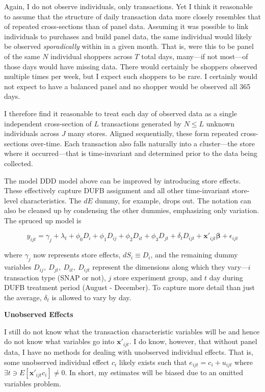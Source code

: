 \documentclass[12pt,letterpaperpaper,]{book}
\begin{document}
Again, I do not observe individuals, only transactions. Yet I think it
reasonable to assume that the structure of daily transaction data more
closely resembles that of repeated cross-sections than of panel data.
Assuming it was possible to link individuals to purchases and build
panel data, the same individual would likely be observed
\emph{sporadically} within in a given month. That is, were this to be
panel of the same \(N\) individual shoppers across \(T\) total days,
many---if not most---of those days would have missing data. There would
certainly be shoppers observed multiple times per week, but I expect
such shoppers to be rare. I certainly would not expect to have a
balanced panel and no shopper would be observed all 365 days.

I therefore find it reasonable to treat each day of observed data as a
single independent cross-section of \(L\) transactions generated by
\(N \le L\) unknown individuals across \(J\) many stores. Aligned
sequentially, these form repeated cross-sections over-time. Each
transaction also falls naturally into a cluster---the store where it
occurred---that is time-invariant and determined prior to the data being
collected.

The model DDD model above can be improved by introducing store effects.
These effectively capture DUFB assignment and all other time-invariant
store-level characteristics. The \(dE\) dummy, for example, drops out.
The notation can also be cleaned up by condensing the other dummies,
emphasizing only variation. The spruced up model is

\begin{equation}
y_{ijt} = \gamma_j + \lambda_t + \phi_0 D_i + \phi_1 D_{ij} + \phi_2 D_{it}+ \phi_3 D_{jt} + \delta_t D_{ijt} + \bm{x'}_{ijt} \bm{\beta} + \epsilon_{ijt}
\label{eq:ddd}
\end{equation}

where \(\gamma_j\) now represents store effects, \(dS_i \equiv D_i\),
and the remaining dummy variables \(D_{ij},~D_{jt},~D_{it},~D_{ijt}\)
represent the dimensions along which they vary---\(i\) transaction type
(SNAP or not), \(j\) store experiment group, and \(t\) day during DUFB
treatment period (August - December). To capture more detail than just
the average, \(\delta_t\) is allowed to vary by day.

\textbf{Unobserved Effects}

I still do not know what the transaction characteristic variables will
be and hence do not know what variables go into \(\bm{x'}_{ijt}\). I do
know, however, that without panel data, I have no methods for dealing
with unobserved individual effects. That is, some unobserved individual
effect \(c_i\) likely exists such that \(e_{ijt} = c_i + u_{ijt}\) where
\(\exists t \ni E[\bm{x'}_{ijt}c_i] \ne 0\). In short, my estimates will
be biased due to an omitted variables problem.
\end{document}
